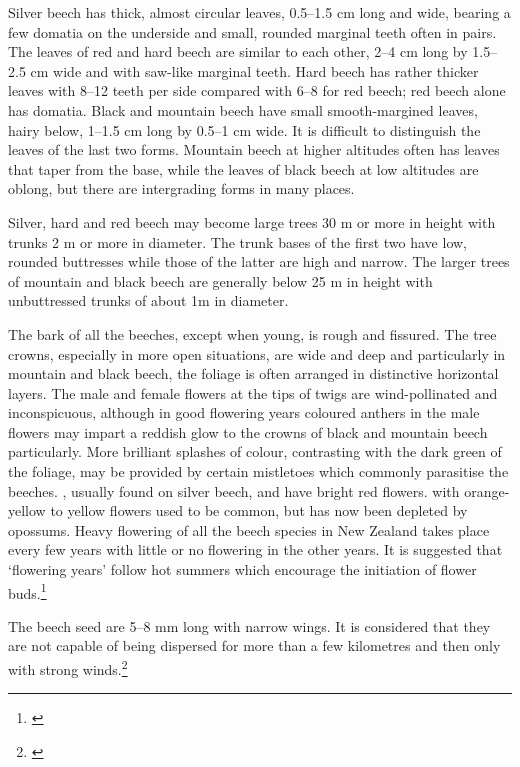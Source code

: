Silver beech has thick, almost circular leaves, 0.5--1.5 cm long and wide, bearing a few domatia on the underside and small, rounded marginal teeth often in pairs.
The leaves of red and hard beech are similar to each other, 2--4 cm long by 1.5--2.5 cm wide and with saw-like marginal teeth.
Hard beech has rather thicker leaves with 8--12 teeth per side compared with 6--8 for red beech; red beech alone has domatia.
Black and mountain beech have small smooth-margined leaves, hairy below, 1--1.5 cm long by 0.5--1 cm wide.
It is difficult to distinguish the leaves of the last two forms.
Mountain beech at higher altitudes often has leaves that taper from the base, while the leaves of black beech at low altitudes are oblong, but there are intergrading forms in many places.

Silver, hard and red beech may become large trees 30 m or more in height with trunks 2 m or more in diameter.
The trunk bases of the first two have low, rounded buttresses while those of the latter are high and narrow.
The larger trees of mountain and black beech are generally below 25 m in height with unbuttressed trunks of about 1m in diameter.

The bark of all the beeches, except when young, is rough and fissured.
The tree crowns, especially in more open situations, are wide and deep and particularly in mountain and black beech, the foliage is often arranged in distinctive horizontal layers.
The male and female flowers at the tips of twigs are wind-pollinated and inconspicuous, although in good flowering years coloured anthers in the male flowers may impart a reddish glow to the crowns of black and mountain beech particularly.
More brilliant splashes of colour, contrasting with the dark green of the foliage, may be provided by certain mistletoes which commonly parasitise the beeches. , usually found on silver beech, and  have bright red flowers.  with orange-yellow to yellow flowers used to be common, but has now been depleted by opossums.
Heavy flowering of all the beech species in New Zealand takes place every few years with little or no flowering in the other years.
It is suggested that `flowering years' follow hot summers which encourage the initiation of flower buds.\footnote{\cite{poole1948flowering}}

The beech seed are 5--8 mm long with narrow wings.
It is considered that they are not capable of being dispersed for more than a few kilometres and then only with strong winds.\footnote{\cite{preest1963dispersal}}

